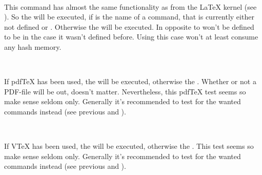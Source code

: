 \begin{Declaration}
  \\
\end{Declaration}
%
%
This command has almost the same functionality as  from
the \LaTeX{} kernel (see \cite{latex:source2e}). So the  will be executed, if  is the name of a command,
that is currently either not defined or . Otherwise the
 will be executed. In opposite to
  won't be defined to be 
in the case it wasn't defined before. Using \eTeX{} this case won't at least
consume any hash memory.%
%
%
%


\begin{Declaration}
  \\
\end{Declaration}
%
%
If pdf\TeX{} has been used, the  will be executed,
otherwise the . Whether or not a PDF-file will be
out, doesn't matter. Nevertheless, this pdf\TeX{} test seems so make sense
seldom only. Generally it's recommended to test for the wanted commands
instead (see previous  and
).
%
%
%


\begin{Declaration}
  \\
\end{Declaration}
%
%
If V\TeX{} has been used, the  will be executed,
otherwise the . This test seems so make sense
seldom only. Generally it's recommended to test for the wanted commands instead
(see previous  and ).
%
%
%


